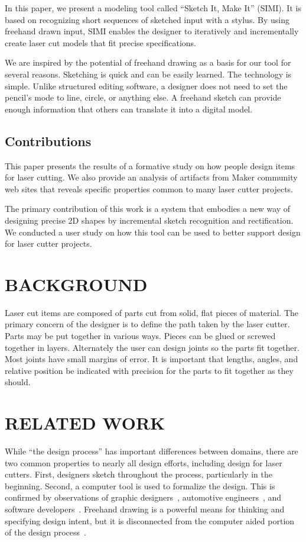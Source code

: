 \documentclass{article}
\begin{document}
In this paper, we present a modeling tool called ``Sketch It, Make
It'' (SIMI).  It is based on recognizing short sequences of sketched
input with a stylus. By using freehand drawn input, SIMI enables the
designer to iteratively and incrementally create laser cut models that
fit precise specifications.

We are inspired by the potential of freehand drawing as a basis for
our tool for several reasons. Sketching is quick and can be easily
learned. The technology is simple.  Unlike structured editing
software, a designer does not need to set the pencil's mode to line,
circle, or anything else. A freehand sketch can provide enough
information that others can translate it into a digital model. 

\subsection{Contributions}

This paper presents the results of a formative study on how people
design items for laser cutting. We also provide an analysis of
artifacts from Maker community web sites that reveals specific
properties common to many laser cutter projects.

The primary contribution of this work is a system that embodies a new
way of designing precise 2D shapes by incremental sketch recognition
and rectification. We conducted a user study on how this tool can be
used to better support design for laser cutter projects.

\section{BACKGROUND}

Laser cut items are composed of parts cut from solid, flat pieces of
material. The primary concern of the designer is to define the path
taken by the laser cutter. Parts may be put together in various ways.
Pieces can be glued or screwed together in layers. Alternately the
user can design joints so the parts fit together. Most joints have
small margins of error. It is important that lengths, angles, and
relative position be indicated with precision for the parts to fit
together as they should.

\section{RELATED WORK}

While ``the design process'' has important differences between
domains, there are two common properties to nearly all design efforts,
including design for laser cutters. First, designers sketch throughout
the process, particularly in the beginning. Second, a computer tool is
used to formalize the design. This is confirmed by observations of
graphic designers~\cite{wong-rr-prototypes}, automotive
engineers~\cite{kara-styling}, and software
developers~\cite{dekel-improvised-notation}. Freehand drawing is a
powerful means for thinking and specifying design intent, but it is
disconnected from the computer aided portion of the design
process~\cite{company-sketching-in-engineering}.
\end{document}
